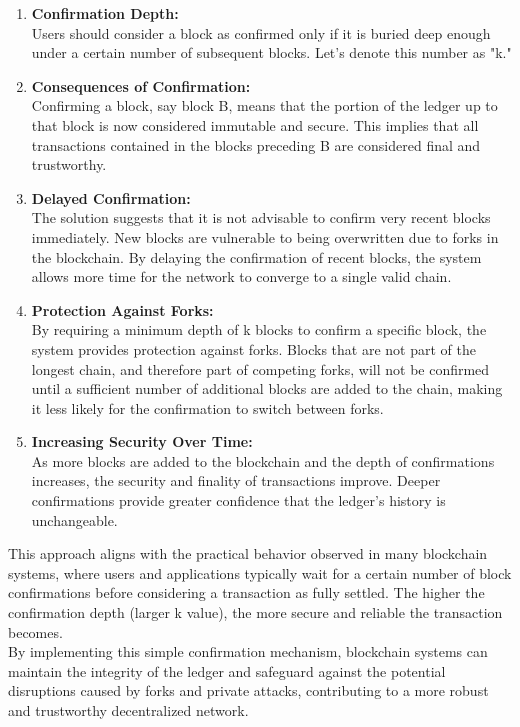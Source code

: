 \begin{enumerate}
	\item \textbf{Confirmation Depth:} \\Users should consider a block as confirmed only if it is buried deep enough under a certain number of subsequent blocks. Let's denote this number as "k."
	\item \textbf{Consequences of Confirmation:}\\Confirming a block, say block B, means that the portion of the ledger up to that block is now considered immutable and secure. This implies that all transactions contained in the blocks preceding B are considered final and trustworthy.
	\item \textbf{Delayed Confirmation:}\\The solution suggests that it is not advisable to confirm very recent blocks immediately. New blocks are vulnerable to being overwritten due to forks in the blockchain. By delaying the confirmation of recent blocks, the system allows more time for the network to converge to a single valid chain.
	\item \textbf{Protection Against Forks:}\\By requiring a minimum depth of k blocks to confirm a specific block, the system provides protection against forks. Blocks that are not part of the longest chain, and therefore part of competing forks, will not be confirmed until a sufficient number of additional blocks are added to the chain, making it less likely for the confirmation to switch between forks.
	\item \textbf{Increasing Security Over Time:}\\As more blocks are added to the blockchain and the depth of confirmations increases, the security and finality of transactions improve. Deeper confirmations provide greater confidence that the ledger's history is unchangeable.
\end{enumerate}
This approach aligns with the practical behavior observed in many blockchain systems, where users and applications typically wait for a certain number of block confirmations before considering a transaction as fully settled. The higher the confirmation depth (larger k value), the more secure and reliable the transaction becomes.\\
By implementing this simple confirmation mechanism, blockchain systems can maintain the integrity of the ledger and safeguard against the potential disruptions caused by forks and private attacks, contributing to a more robust and trustworthy decentralized network.\\
